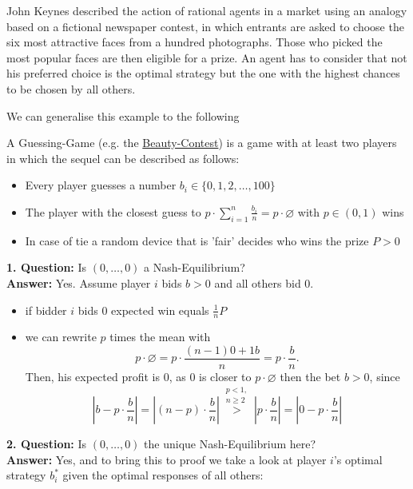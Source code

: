 \begin{example}  \label{Beauty-Contest}
John Keynes described the action of rational agents in a market using an analogy based on a fictional newspaper contest, in which entrants are asked to choose the six most attractive faces from a hundred photographs. Those who picked the most popular faces are then eligible for a prize. An agent has to consider that not his preferred choice is the optimal strategy but the one with the highest chances to be chosen by all others.
\end{example}
We can generalise this example to the following \\
\begin{example}  \label{Guessing-Game}
	 A Guessing-Game (e.g. the \hyperref[Beauty-Contest]{Beauty-Contest}) is a game with at least two players in which the sequel can be described as follows:
	\begin{itemize}
		\item Every player guesses a number $b_{i} \in \{0, 1, 2, \dotsc, 100 \}$
		\item The player with the closest guess to $p \cdot \sum_{i = 1}^{n} \frac{b_{i}}{n} = p \cdot \varnothing$ with $p \in (0, 1)$ wins
		\item In case of tie a random device that is 'fair' decides who wins the prize $P > 0$
	\end{itemize}
	\textbf{1. Question:} Is $(0, \dotsc, 0)$ a Nash-Equilibrium? \\
	\textbf{Answer:} Yes. Assume player $i$ bids $b > 0$ and all others bid $0$.	
		\begin{itemize}
			\item if bidder $i$ bids $0$ expected win equals $\frac{1}{n} P $
			\item we can rewrite $p$ times the mean with	
				\[ p \cdot \varnothing = p \cdot \frac{(n - 1)0 + 1 b}{n} = p \cdot \frac{b}{n}. \]
			Then, his expected profit is $0$, as $0$ is closer to $p \cdot \varnothing$ then the bet $b > 0$, since
			\[ \left| b - p \cdot \frac{b}{n} \right| =  \left|(n-p) \cdot \frac{b}{n} \right| \overset{\substack{p < 1, \\ n \geq 2}}{>} \left| p \cdot \frac{b}{n} \right| = \left| 0 - p \cdot \frac{b}{n} \right| \]
		\end{itemize}
	
	\textbf{2. Question:} Is $(0, \dotsc, 0)$ the unique Nash-Equilibrium here? \\
	\textbf{Answer:} Yes, and to bring this to proof we take a look at player $i$'s optimal strategy $b_{i}^{*}$ given the optimal responses of all others:
	

\end{example}
